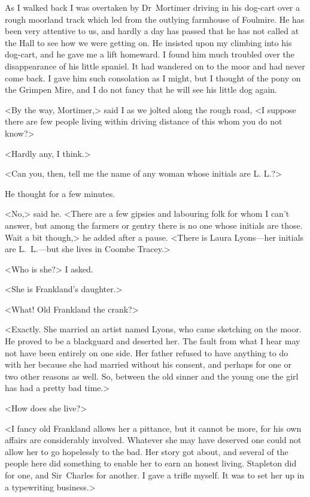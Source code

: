 As I walked back I was overtaken by Dr~Mortimer driving in his dog-cart over a rough moorland track which led from the outlying farmhouse of Foulmire. He has been very attentive to us, and hardly a day has passed that he has not called at the Hall to see how we were getting on. He insisted upon my climbing into his dog-cart, and he gave me a lift homeward. I found him much troubled over the disappearance of his little spaniel. It had wandered on to the moor and had never come back. I gave him such consolation as I might, but I thought of the pony on the Grimpen Mire, and I do not fancy that he will see his little dog again.

<By the way, Mortimer,> said I as we jolted along the rough road, <I suppose there are few people living within driving distance of this whom you do not know?>

<Hardly any, I think.>

<Can you, then, tell me the name of any woman whose initials are L\@. L\@.?>

He thought for a few minutes.

<No,> said he. <There are a few gipsies and labouring folk for whom I can't answer, but among the farmers or gentry there is no one whose initials are those. Wait a bit though,> he added after a pause. <There is Laura Lyons—her initials are L\@.~L\@.—but she lives in Coombe Tracey.>

<Who is she?> I asked.

<She is Frankland's daughter.>

<What! Old Frankland the crank?>

<Exactly. She married an artist named Lyons, who came sketching on the moor. He proved to be a blackguard and deserted her. The fault from what I hear may not have been entirely on one side. Her father refused to have anything to do with her because she had married without his consent, and perhaps for one or two other reasons as well. So, between the old sinner and the young one the girl has had a pretty bad time.>

<How does she live?>

<I fancy old Frankland allows her a pittance, but it cannot be more, for his own affairs are considerably involved. Whatever she may have deserved one could not allow her to go hopelessly to the bad. Her story got about, and several of the people here did something to enable her to earn an honest living. Stapleton did for one, and Sir~Charles for another. I gave a trifle myself. It was to set her up in a typewriting business.>

